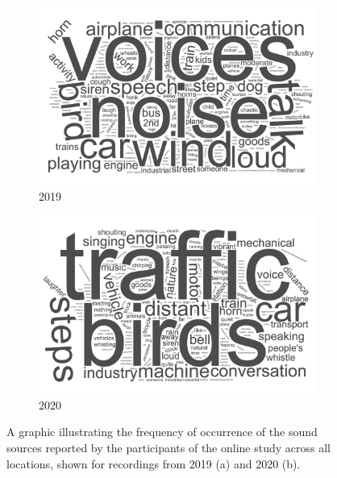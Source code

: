    \begin{figure}[h]
    \begin{subfigure}[b]{0.45\textwidth}
      \centering
      \includegraphics[width=\textwidth]{Figures/Figure3a.jpg}
      \caption{2019 \label{fig:wordcloudA}}
    \end{subfigure}
    \hfill
    \begin{subfigure}[b]{0.45\textwidth}
      \centering
      \includegraphics[width=\textwidth]{Figures/Figure3b.jpg}
      \caption{2020 \label{fig:wordcloudB}}     
    \end{subfigure}
    \caption{A graphic illustrating the frequency of occurrence of the sound sources reported by the participants of the online study across all locations, shown for recordings from 2019 (a) and 2020 (b). \label{fig:wordclouds}}
    \end{figure}

